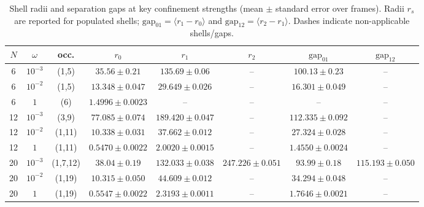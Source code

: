 \documentclass[superscriptaddress,unsortedaddress,amsmath,amssymb,aps]{revtex4-2}
\begin{document}
\begin{table}[t]
  \centering
  \caption{Shell radii and separation gaps at key confinement strengths (mean $\pm$ standard error over frames).
  Radii $r_s$ are reported for populated shells; $\mathrm{gap}_{01}=\langle r_1-r_0\rangle$ and
  $\mathrm{gap}_{12}=\langle r_2-r_1\rangle$. Dashes indicate non-applicable shells/gaps.}
  \label{tab:radii_gaps_key}

  \begin{threeparttable}
    \setlength{\tabcolsep}{4.2pt}
    \renewcommand{\arraystretch}{1.10}
    \begin{adjustbox}{max width=\textwidth}
    \begin{tabular}{c c c c c c c c}
      \toprule
      $N$ & $\omega$ & occ. &
      $r_0$ & $r_1$ & $r_2$ &
      $\mathrm{gap}_{01}$ & $\mathrm{gap}_{12}$ \\
      \midrule
      6  & $10^{-3}$ & (1,5)    & $35.56\pm0.21$ & $135.69\pm0.06$ & -- &
      $100.13\pm0.23$ & -- \\
      6  & $10^{-2}$ & (1,5)    & $13.348\pm0.047$ & $29.649\pm0.026$ & -- &
      $16.301\pm0.049$ & -- \\
      6  & $1$       & (6)      & $1.4996\pm0.0023$ & -- & -- &
      -- & -- \\
      \midrule
      12 & $10^{-3}$ & (3,9)    & $77.085\pm0.074$ & $189.420\pm0.047$ & -- &
      $112.335\pm0.092$ & -- \\
      12 & $10^{-2}$ & (1,11)   & $10.338\pm0.031$ & $37.662\pm0.012$ & -- &
      $27.324\pm0.028$ & -- \\
      12 & $1$       & (1,11)   & $0.5470\pm0.0022$ & $2.0020\pm0.0015$ & -- &
      $1.4550\pm0.0024$ & -- \\
      \midrule
      20 & $10^{-3}$ & (1,7,12) & $38.04\pm0.19$ & $132.033\pm0.038$ & $247.226\pm0.051$ &
      $93.99\pm0.18$ & $115.193\pm0.050$ \\
      20 & $10^{-2}$ & (1,19)   & $10.315\pm0.050$ & $44.609\pm0.012$ & -- &
      $34.294\pm0.048$ & -- \\
      20 & $1$       & (1,19)   & $0.5547\pm0.0022$ & $2.3193\pm0.0011$ & -- &
      $1.7646\pm0.0021$ & -- \\
      \bottomrule
    \end{tabular}
    \end{adjustbox}
  \end{threeparttable}
\end{table}
\end{document}
